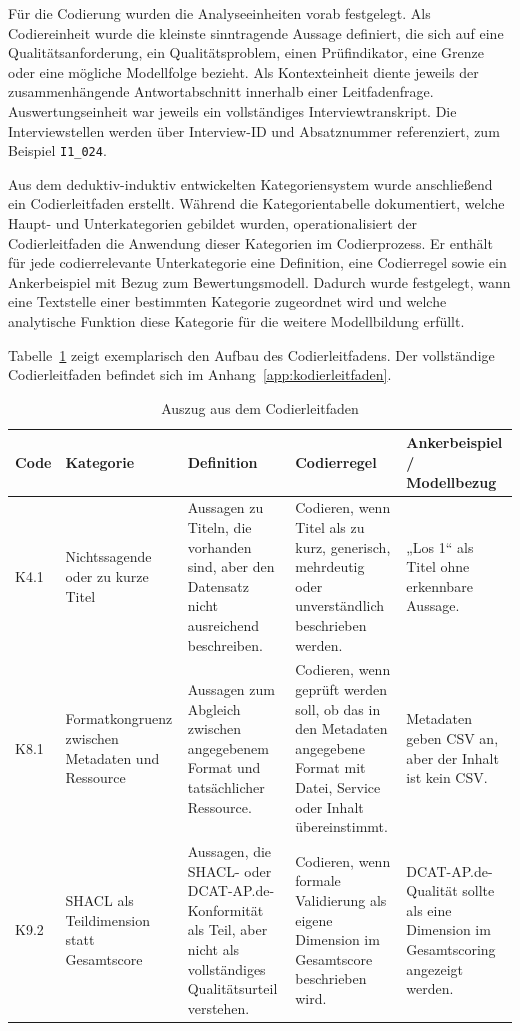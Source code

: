 Für die Codierung wurden die Analyseeinheiten vorab festgelegt. Als Codiereinheit wurde die kleinste sinntragende Aussage definiert, die sich auf eine Qualitätsanforderung, ein Qualitätsproblem, einen Prüfindikator, eine Grenze oder eine mögliche Modellfolge bezieht. Als Kontexteinheit diente jeweils der zusammenhängende Antwortabschnitt innerhalb einer Leitfadenfrage. Auswertungseinheit war jeweils ein vollständiges Interviewtranskript. Die Interviewstellen werden über Interview-ID und Absatznummer referenziert, zum Beispiel \texttt{I1\_024}.

Aus dem deduktiv-induktiv entwickelten Kategoriensystem wurde anschließend ein Codierleitfaden erstellt. Während die Kategorientabelle dokumentiert, welche Haupt- und Unterkategorien gebildet wurden, operationalisiert der Codierleitfaden die Anwendung dieser Kategorien im Codierprozess. Er enthält für jede codierrelevante Unterkategorie eine Definition, eine Codierregel sowie ein Ankerbeispiel mit Bezug zum Bewertungsmodell. Dadurch wurde festgelegt, wann eine Textstelle einer bestimmten Kategorie zugeordnet wird und welche analytische Funktion diese Kategorie für die weitere Modellbildung erfüllt.

Tabelle~\ref{tab:auszug_kodierleitfaden} zeigt exemplarisch den Aufbau des Codierleitfadens. Der vollständige Codierleitfaden befindet sich im Anhang~\ref{app:kodierleitfaden}.

\begin{table}[H]
\centering
\scriptsize
\renewcommand{\arraystretch}{1.1}
\begin{tabularx}{\textwidth}{p{1.3cm} p{3.2cm} X X X}
\toprule
\textbf{Code} & \textbf{Kategorie} & \textbf{Definition} & \textbf{Codierregel} & \textbf{Ankerbeispiel / Modellbezug} \\
\midrule

K4.1 & Nichtssagende oder zu kurze Titel
& Aussagen zu Titeln, die vorhanden sind, aber den Datensatz nicht ausreichend beschreiben.
& Codieren, wenn Titel als zu kurz, generisch, mehrdeutig oder unverständlich beschrieben werden.
& „Los 1“ als Titel ohne erkennbare Aussage. \\ \hline

K8.1 & Formatkongruenz zwischen Metadaten und Ressource
& Aussagen zum Abgleich zwischen angegebenem Format und tatsächlicher Ressource.
& Codieren, wenn geprüft werden soll, ob das in den Metadaten angegebene Format mit Datei, Service oder Inhalt übereinstimmt.
& Metadaten geben CSV an, aber der Inhalt ist kein CSV. \\ \hline

K9.2 & SHACL als Teildimension statt Gesamtscore
& Aussagen, die SHACL- oder DCAT-AP.de-Konformität als Teil, aber nicht als vollständiges Qualitätsurteil verstehen.
& Codieren, wenn formale Validierung als eigene Dimension im Gesamtscore beschrieben wird.
& DCAT-AP.de-Qualität sollte als eine Dimension im Gesamtscoring angezeigt werden.  \\

\bottomrule
\end{tabularx}
\caption{Auszug aus dem Codierleitfaden}
\label{tab:auszug_kodierleitfaden}
\end{table}

